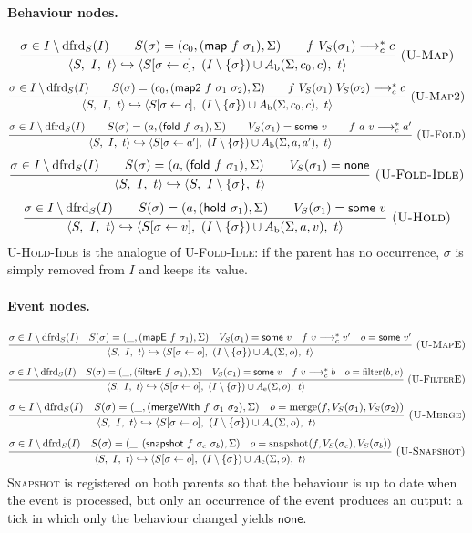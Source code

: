\documentclass{article}
\makeatletter
\newcommand{\kw}[1]{\mathsf{#1}}
\newcommand{\none}{\kw{none}}
\newcommand{\some}[1]{\kw{some}\ #1}
\newcommand{\cfg}[3]{\langle #1,\ #2,\ #3\rangle}
\newcommand{\cstar}{\mathrel{\longrightarrow_{c}^{*}}}
\newcommand{\ustep}{\hookrightarrow}
\newcommand{\dfrd}{\mathrm{dfrd}}
\newcommand{\fire}{\sigma \in I \setminus \dfrd_S(I)}
\newcommand{\rul}[3]{\[\dfrac{\begin{array}{@{}c@{}}#2\end{array}}{\begin{array}{@{}c@{}}#3\end{array}}\ \textsc{#1}\]}
\makeatother
\begin{document}
\paragraph{Behaviour nodes.}
\rul{(U-Map)}{\fire \qquad S(\sigma) = (c_0,(\kw{map}\ f\ \sigma_1),\Sigma) \qquad f\ V_S(\sigma_1) \cstar c}
{\cfg{S}{I}{t} \ustep \cfg{S[\sigma \leftarrow c]}{(I \setminus \{\sigma\}) \cup A_{\mathrm{b}}(\Sigma,c_0,c)}{t}}
\rul{(U-Map2)}{\fire \qquad S(\sigma) = (c_0,(\kw{map2}\ f\ \sigma_1\ \sigma_2),\Sigma) \qquad f\ V_S(\sigma_1)\ V_S(\sigma_2) \cstar c}
{\cfg{S}{I}{t} \ustep \cfg{S[\sigma \leftarrow c]}{(I \setminus \{\sigma\}) \cup A_{\mathrm{b}}(\Sigma,c_0,c)}{t}}
\rul{(U-Fold)}{\fire \qquad S(\sigma) = (a,(\kw{fold}\ f\ \sigma_1),\Sigma) \qquad V_S(\sigma_1) = \some{v} \qquad f\ a\ v \cstar a'}
{\cfg{S}{I}{t} \ustep \cfg{S[\sigma \leftarrow a']}{(I \setminus \{\sigma\}) \cup A_{\mathrm{b}}(\Sigma,a,a')}{t}}
\rul{(U-Fold-Idle)}{\fire \qquad S(\sigma) = (a,(\kw{fold}\ f\ \sigma_1),\Sigma) \qquad V_S(\sigma_1) = \none}
{\cfg{S}{I}{t} \ustep \cfg{S}{I \setminus \{\sigma\}}{t}}
\rul{(U-Hold)}{\fire \qquad S(\sigma) = (a,(\kw{hold}\ \sigma_1),\Sigma) \qquad V_S(\sigma_1) = \some{v}}
{\cfg{S}{I}{t} \ustep \cfg{S[\sigma \leftarrow v]}{(I \setminus \{\sigma\}) \cup A_{\mathrm{b}}(\Sigma,a,v)}{t}}
\textsc{U-Hold-Idle} is the analogue of \textsc{U-Fold-Idle}: if the parent has no occurrence, $\sigma$ is simply removed from $I$ and keeps its value.

\paragraph{Event nodes.}
\rul{(U-MapE)}{\fire \quad S(\sigma) = (\_,(\kw{mapE}\ f\ \sigma_1),\Sigma) \quad V_S(\sigma_1) = \some{v} \quad f\ v \cstar v' \quad o = \some{v'}}
{\cfg{S}{I}{t} \ustep \cfg{S[\sigma \leftarrow o]}{(I \setminus \{\sigma\}) \cup A_{\mathrm{e}}(\Sigma,o)}{t}}
\rul{(U-FilterE)}{\fire \quad S(\sigma) = (\_,(\kw{filterE}\ f\ \sigma_1),\Sigma) \quad V_S(\sigma_1) = \some{v} \quad f\ v \cstar b \quad o = \mathrm{filter}(b,v)}
{\cfg{S}{I}{t} \ustep \cfg{S[\sigma \leftarrow o]}{(I \setminus \{\sigma\}) \cup A_{\mathrm{e}}(\Sigma,o)}{t}}
\rul{(U-Merge)}{\fire \quad S(\sigma) = (\_,(\kw{mergeWith}\ f\ \sigma_1\ \sigma_2),\Sigma) \quad o = \mathrm{merge}(f,V_S(\sigma_1),V_S(\sigma_2))}
{\cfg{S}{I}{t} \ustep \cfg{S[\sigma \leftarrow o]}{(I \setminus \{\sigma\}) \cup A_{\mathrm{e}}(\Sigma,o)}{t}}
\rul{(U-Snapshot)}{\fire \quad S(\sigma) = (\_,(\kw{snapshot}\ f\ \sigma_e\ \sigma_b),\Sigma) \quad o = \mathrm{snapshot}(f,V_S(\sigma_e),V_S(\sigma_b))}
{\cfg{S}{I}{t} \ustep \cfg{S[\sigma \leftarrow o]}{(I \setminus \{\sigma\}) \cup A_{\mathrm{e}}(\Sigma,o)}{t}}
\textsc{Snapshot} is registered on both parents so that the behaviour is up to date when the event is processed, but only an occurrence of the event produces an output: a tick in which only the behaviour changed yields $\none$.
\end{document}
